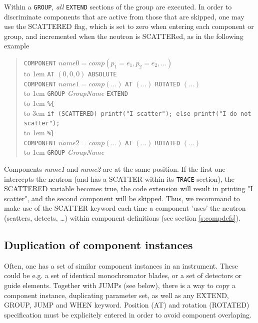 Within a \texttt{GROUP}, \emph{all} \texttt{EXTEND} sections of the group are executed. In order to discriminate components that are active from those that are skipped, one may use the SCATTERED flag, which is set to zero when entering each component or group, and incremented when the neutron is SCATTERed, as in the following example  
\begin{quote}
  \texttt{COMPONENT} $\textit{name0} =
    \textit{comp}(p_1 = e_1, p_2 = e_2, \ldots)$ \\
    \hbox to 1em{} \texttt{AT} $(0,0,0)$ \texttt{ABSOLUTE} \\
  \texttt{COMPONENT} $\textit{name1} =
    \textit{comp}(\ldots)$ \texttt{AT} $(...)$  \texttt{ROTATED} $(...)$ \\
  \hbox to 1em{} \texttt{GROUP} \textit{GroupName} \texttt{EXTEND} \\
  \hbox to 1em{} \verb|%{| \\
  \hbox to 3em{} \verb+if (SCATTERED) printf("I scatter"); else printf("I do not scatter");+\\
  \hbox to 1em{} \verb|%}| \\
  \texttt{COMPONENT} $\textit{name2} =
    \textit{comp}(\ldots)$ \texttt{AT} $(...)$ \texttt{ROTATED} $(...)$ \\
  \hbox to 1em{} \texttt{GROUP} \textit{GroupName}
\end{quote}
Components \emph{name1} and \emph{name2} are at the same position. If the first one intercepts the neutron (and has a SCATTER within its \texttt{TRACE} section), the SCATTERED variable becomes true, the code extension will result in printing "I scatter", and the second component will be skipped.
Thus, we recommand to make use of the SCATTER keyword each time a component 'uses' the neutron (scatters, detects, \ldots) within component definitions (see section \ref{s:compdefs}).

\subsection{Duplication of component instances}
\label{s:instrdefs-extend-copy}

Often, one has a set of similar component instances in an instrument. These could be e.g. a set of identical monochromator blades, or a set of detectors or guide elements.
Together with JUMPs (see below), there is a way to copy a component instance, duplicating parameter set, as well as any EXTEND, GROUP, JUMP and WHEN keyword.
Position (AT) and rotation (ROTATED) specification must be explicitely entered in order to avoid component overlaping.

